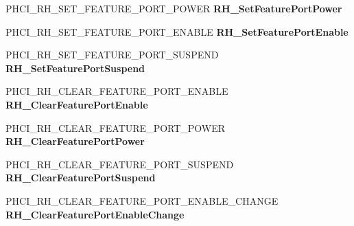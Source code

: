 \begin{DoxyCompactItemize}
P\+H\+C\+I\+\_\+\+R\+H\+\_\+\+S\+E\+T\+\_\+\+F\+E\+A\+T\+U\+R\+E\+\_\+\+P\+O\+R\+T\+\_\+\+P\+O\+W\+ER {\bfseries R\+H\+\_\+\+Set\+Feature\+Port\+Power}
\item 
\mbox{\label{struct___u_s_b_p_o_r_t___r_e_g_i_s_t_r_a_t_i_o_n___p_a_c_k_e_t_aeb0406cd04f3483cb0eef8a6dddba010}} 
P\+H\+C\+I\+\_\+\+R\+H\+\_\+\+S\+E\+T\+\_\+\+F\+E\+A\+T\+U\+R\+E\+\_\+\+P\+O\+R\+T\+\_\+\+E\+N\+A\+B\+LE {\bfseries R\+H\+\_\+\+Set\+Feature\+Port\+Enable}
\item 
\mbox{\label{struct___u_s_b_p_o_r_t___r_e_g_i_s_t_r_a_t_i_o_n___p_a_c_k_e_t_a6128e2fcc149d1fce008d6a9f49cf7b9}} 
P\+H\+C\+I\+\_\+\+R\+H\+\_\+\+S\+E\+T\+\_\+\+F\+E\+A\+T\+U\+R\+E\+\_\+\+P\+O\+R\+T\+\_\+\+S\+U\+S\+P\+E\+ND {\bfseries R\+H\+\_\+\+Set\+Feature\+Port\+Suspend}
\item 
\mbox{\label{struct___u_s_b_p_o_r_t___r_e_g_i_s_t_r_a_t_i_o_n___p_a_c_k_e_t_a845a39b3a2180142e3750a1583cb68d0}} 
P\+H\+C\+I\+\_\+\+R\+H\+\_\+\+C\+L\+E\+A\+R\+\_\+\+F\+E\+A\+T\+U\+R\+E\+\_\+\+P\+O\+R\+T\+\_\+\+E\+N\+A\+B\+LE {\bfseries R\+H\+\_\+\+Clear\+Feature\+Port\+Enable}
\item 
\mbox{\label{struct___u_s_b_p_o_r_t___r_e_g_i_s_t_r_a_t_i_o_n___p_a_c_k_e_t_a12096e8774869781fb795dea8dd6217f}} 
P\+H\+C\+I\+\_\+\+R\+H\+\_\+\+C\+L\+E\+A\+R\+\_\+\+F\+E\+A\+T\+U\+R\+E\+\_\+\+P\+O\+R\+T\+\_\+\+P\+O\+W\+ER {\bfseries R\+H\+\_\+\+Clear\+Feature\+Port\+Power}
\item 
\mbox{\label{struct___u_s_b_p_o_r_t___r_e_g_i_s_t_r_a_t_i_o_n___p_a_c_k_e_t_afd5b13071c8039ab831da83b64ca6c9c}} 
P\+H\+C\+I\+\_\+\+R\+H\+\_\+\+C\+L\+E\+A\+R\+\_\+\+F\+E\+A\+T\+U\+R\+E\+\_\+\+P\+O\+R\+T\+\_\+\+S\+U\+S\+P\+E\+ND {\bfseries R\+H\+\_\+\+Clear\+Feature\+Port\+Suspend}
\item 
\mbox{\label{struct___u_s_b_p_o_r_t___r_e_g_i_s_t_r_a_t_i_o_n___p_a_c_k_e_t_a5bc764737afe3d03b425a9203036b82d}} 
P\+H\+C\+I\+\_\+\+R\+H\+\_\+\+C\+L\+E\+A\+R\+\_\+\+F\+E\+A\+T\+U\+R\+E\+\_\+\+P\+O\+R\+T\+\_\+\+E\+N\+A\+B\+L\+E\+\_\+\+C\+H\+A\+N\+GE {\bfseries R\+H\+\_\+\+Clear\+Feature\+Port\+Enable\+Change}

\end{DoxyCompactItemize}
